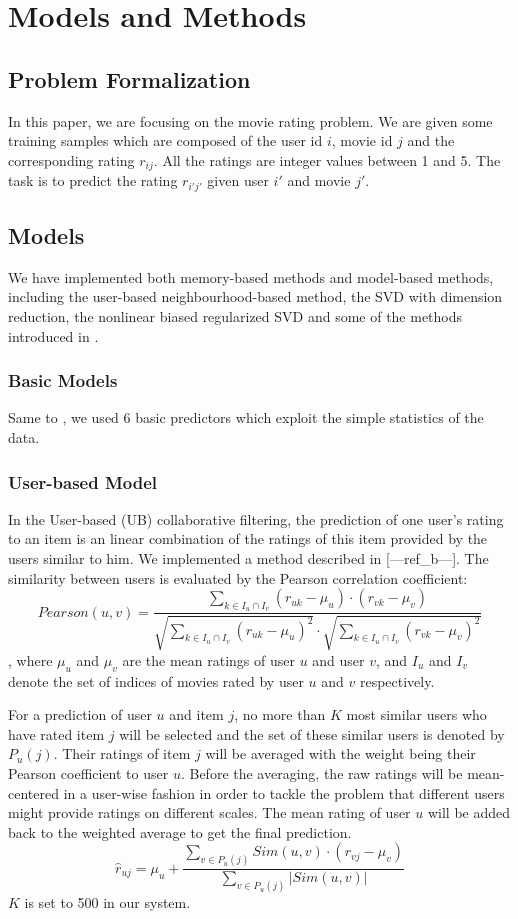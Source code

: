 \documentclass[10pt,conference,compsocconf]{IEEEtran}
\begin{document}
\section{Models and Methods}
\subsection{Problem Formalization}
In this paper, we are focusing on the movie rating problem. We are given some training samples which are composed of the user id $i$, movie id $j$ and the corresponding rating $r_{ij}$. All the ratings are integer values between 1 and 5. The task is to predict the rating $r_{i'j'}$ given user $i'$ and movie $j'$.

\subsection{Models}
We have implemented both memory-based methods and model-based methods, including the user-based neighbourhood-based method, the SVD with dimension reduction, the nonlinear biased regularized SVD and some of the methods introduced in \cite{Paterek2007Improving}.
\subsubsection{Basic Models}
Same to \cite{Paterek2007Improving}, we used 6 basic predictors which exploit the simple statistics of the data.

\subsubsection{User-based Model}
In the User-based (UB) collaborative filtering, the prediction of one user's rating to an item is an linear combination of the ratings of this item provided by the users similar to him. We implemented a method described in [---ref\_b---]. The similarity between users is evaluated by the Pearson correlation coefficient:
$$Pearson(u,v) = \frac{{\sum\limits_{k \in {I_u} \cap {I_v}} {({r_{uk}} - {\mu _u}) \cdot ({r_{vk}} - {\mu _v})} }}{{\sqrt {\sum\limits_{k \in {I_u} \cap {I_v}} {{{({r_{uk}} - {\mu _u})}^2}} }  \cdot \sqrt {\sum\limits_{k \in {I_u} \cap {I_v}} {{{({r_{vk}} - {\mu _v})}^2}} } }}$$
, where $\mu _u$ and $\mu _v$ are the mean ratings of user $u$ and user $v$, and ${I_u}$ and ${I_v}$ denote the set of indices of movies rated by user $u$ and $v$ respectively.

For a prediction of user $u$ and item $j$, no more than $K$ most similar users who have rated item $j$ will be selected and the set of these similar users is denoted by ${P_u}(j)$. Their ratings of item $j$ will be averaged with the weight being their Pearson coefficient to user $u$. Before the averaging, the raw ratings will be mean-centered in a user-wise fashion in order to tackle the problem that different users might provide ratings on different scales. The mean rating of user $u$ will be added back to the weighted average to get the final prediction.
$${\hat r_{uj}} = {\mu _u} + \frac{{\sum\limits_{v \in {P_u}(j)} {Sim(u,v) \cdot ({r_{vj}} - {\mu _v})} }}{{\sum\limits_{v \in {P_u}(j)} {\left| {Sim(u,v)} \right|} }}$$
$K$ is set to 500 in our system.
\end{document}
